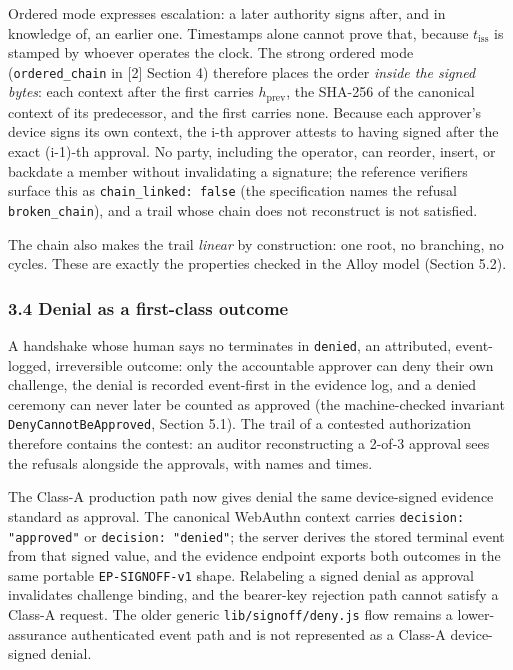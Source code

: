 \documentclass[
  11pt,
]{article}
\begin{document}
Ordered mode expresses escalation: a later authority signs after, and in
knowledge of, an earlier one. Timestamps alone cannot prove that,
because $t_{\mathrm{iss}}$ is stamped by whoever operates the clock.
The strong ordered mode (\texttt{ordered\_chain} in {[}2{]} Section 4)
therefore places the order \emph{inside the signed bytes}: each context
after the first carries $h_{\mathrm{prev}}$, the SHA-256 of the
canonical context of its predecessor, and the first carries none.
Because each approver's device signs its own context, the i-th approver
attests to having signed after the exact (i-1)-th approval. No party,
including the operator, can reorder, insert, or backdate a member
without invalidating a signature; the reference verifiers surface this
as \texttt{chain\_linked:\ false} (the specification names the refusal
\texttt{broken\_chain}), and a trail whose chain does not reconstruct is
not satisfied.

The chain also makes the trail \emph{linear} by construction: one root,
no branching, no cycles. These are exactly the properties checked in the
Alloy model (Section 5.2).

\subsubsection{3.4 Denial as a first-class
outcome}\label{denial-as-a-first-class-outcome}

A handshake whose human says no terminates in \texttt{denied}, an
attributed, event-logged, irreversible outcome: only the accountable
approver can deny their own challenge, the denial is recorded
event-first in the evidence log, and a denied ceremony can never later
be counted as approved (the machine-checked invariant
\texttt{DenyCannotBeApproved}, Section 5.1). The trail of a contested
authorization therefore contains the contest: an auditor reconstructing
a 2-of-3 approval sees the refusals alongside the approvals, with names
and times.

The Class-A production path now gives denial the same device-signed
evidence standard as approval. The canonical WebAuthn context carries
\texttt{decision: "approved"} or \texttt{decision: "denied"}; the
server derives the stored terminal event from that signed value, and the
evidence endpoint exports both outcomes in the same portable
\texttt{EP-SIGNOFF-v1} shape. Relabeling a signed denial as approval
invalidates challenge binding, and the bearer-key rejection path cannot
satisfy a Class-A request. The older generic
\texttt{lib/signoff/deny.js} flow remains a lower-assurance authenticated
event path and is not represented as a Class-A device-signed denial.
\end{document}
